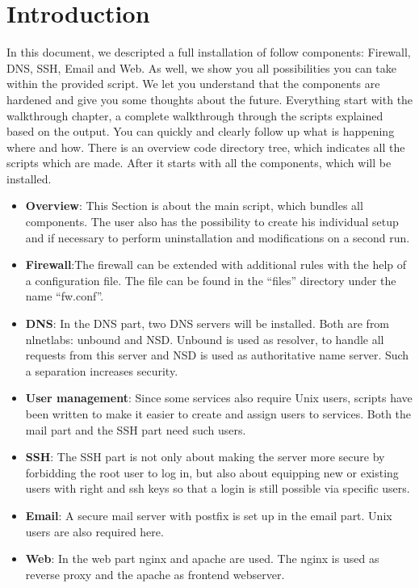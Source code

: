 \clearpage
\chapter{Introduction}
In this document, we descripted a full installation of follow components: Firewall, DNS, SSH, Email and Web. As well, we show you all possibilities you can take within the provided script. We let you understand that the components are hardened and give you some thoughts about the future. Everything start with the walkthrough chapter, a complete walkthrough through the scripts explained based on the output. You can quickly and clearly follow up what is happening where and how. There is an overview code directory tree, which indicates all the scripts which are made. After it starts with all the components, which will be installed.
\begin{itemize} 
	\item \textbf{Overview}: This Section is about the main script, which bundles all components. The user also has the possibility to create his individual setup and if necessary to perform uninstallation and modifications on a second run.
	\item \textbf{Firewall}:The firewall can be extended with additional rules with the help of a configuration file. The file can be found in the ``files'' directory under the name ``fw.conf''.
	\item \textbf{DNS}: In the DNS part, two DNS servers will be installed. Both are from nlnetlabs: unbound and NSD. Unbound is used as resolver, to handle all requests from this server and NSD is used as authoritative name server. Such a separation increases security.
	\item \textbf{User management}: Since some services also require Unix users, scripts have been written to make it easier to create and assign users to services. Both the mail part and the SSH part need such users.
	\item \textbf{SSH}: The SSH part is not only about making the server more secure by forbidding the root user to log in, but also about equipping new or existing users with right and ssh keys so that a login is still possible via specific users.
	\item \textbf{Email}: A secure mail server with postfix is set up in the email part. Unix users are also required here.
	\item \textbf{Web}: In the web part nginx and apache are used. The nginx is used as reverse proxy and the apache as frontend webserver.
\end{itemize}

